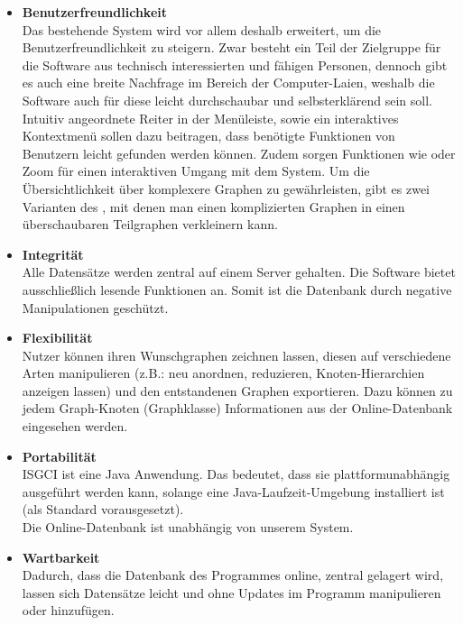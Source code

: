 \documentclass[10pt,a4paper]{article}
\newcommand{\G}[1]{\glqq\text{#1}\grqq} %
\begin{document}
\begin{itemize}	
		\item \textbf{Benutzerfreundlichkeit}\\
		Das bestehende System wird vor allem deshalb erweitert, um die Benutzerfreundlichkeit zu steigern. Zwar besteht ein Teil der Zielgruppe für die Software aus technisch interessierten und fähigen Personen, dennoch gibt es auch eine breite Nachfrage im Bereich der Computer-Laien, weshalb die Software auch für diese leicht durchschaubar und selbsterklärend sein soll. Intuitiv angeordnete Reiter in der Menüleiste, sowie ein interaktives Kontextmenü sollen dazu beitragen, dass benötigte Funktionen von Benutzern leicht gefunden werden können. Zudem sorgen Funktionen wie \G{Grab\&Pull} oder Zoom für einen interaktiven Umgang mit dem System. Um die Übersichtlichkeit über komplexere Graphen zu gewährleisten, gibt es zwei Varianten des \G{Expanding/Collapsing}, mit denen man einen komplizierten Graphen in einen überschaubaren Teilgraphen verkleinern kann.
		\item \textbf{Integrität}\\
		Alle Datensätze werden zentral auf einem Server gehalten. Die Software bietet ausschließlich lesende Funktionen an. Somit ist die Datenbank durch negative Manipulationen geschützt.
		\item \textbf{Flexibilität}\\
		Nutzer können ihren Wunschgraphen zeichnen lassen, diesen auf verschiedene Arten manipulieren (z.B.: neu anordnen, reduzieren, Knoten-Hierarchien anzeigen lassen) und den entstandenen Graphen exportieren. Dazu können zu jedem Graph-Knoten (Graphklasse) Informationen aus der Online-Datenbank eingesehen werden.  
		\item \textbf{Portabilität}\\
		ISGCI ist eine Java Anwendung. Das bedeutet, dass sie plattformunabhängig ausgeführt werden kann, solange eine Java-Laufzeit-Umgebung installiert ist (als Standard vorausgesetzt).\\
		Die Online-Datenbank ist unabhängig von unserem System. 
		\item \textbf{Wartbarkeit}\\
		Dadurch, dass die Datenbank des Programmes online, zentral gelagert wird, lassen sich Datensätze leicht und ohne Updates im Programm manipulieren oder hinzufügen.
		\end{itemize}
\end{document}
